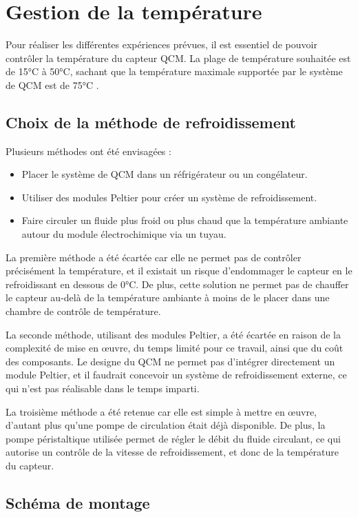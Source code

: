 \chapter{Gestion de la température}
\label{chap:Gestion de la température}
Pour réaliser les différentes expériences prévues, il est essentiel de pouvoir contrôler la température du capteur QCM.  
La plage de température souhaitée est de 15°C à 50°C, sachant que la température maximale supportée par le système de QCM est de 75°C \cite{manual-openqcmQ1}.

\section{Choix de la méthode de refroidissement}

Plusieurs méthodes ont été envisagées :
\begin{itemize}[label=\textbullet]
    \item Placer le système de QCM dans un réfrigérateur ou un congélateur.
    \item Utiliser des modules Peltier pour créer un système de refroidissement.
    \item Faire circuler un fluide plus froid ou plus chaud que la température ambiante autour du module électrochimique via un tuyau.
\end{itemize}

La première méthode a été écartée car elle ne permet pas de contrôler précisément la température, et il existait un risque d’endommager le capteur en le refroidissant en dessous de 0°C. De plus, cette solution ne permet pas de chauffer le capteur au-delà de la température ambiante à moins de le placer dans une chambre de contrôle de température.  

La seconde méthode, utilisant des modules Peltier, a été écartée en raison de la complexité de mise en œuvre, du temps limité pour ce travail, ainsi que du coût des composants. Le designe du QCM ne permet pas d’intégrer directement un module Peltier, et il faudrait concevoir un système de refroidissement externe, ce qui n’est pas réalisable dans le temps imparti.

La troisième méthode a été retenue car elle est simple à mettre en œuvre, d’autant plus qu’une pompe de circulation était déjà disponible. De plus, la pompe péristaltique utilisée permet de régler le débit du fluide circulant, ce qui autorise un contrôle de la vitesse de refroidissement, et donc de la température du capteur.

\section{Schéma de montage}


